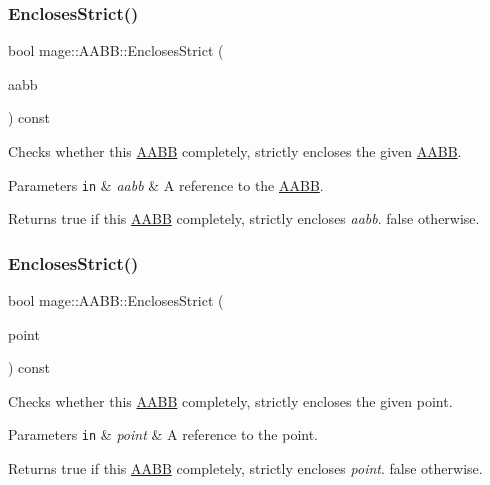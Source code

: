 \subsubsection{\texorpdfstring{Encloses\+Strict()}{EnclosesStrict()}\hspace{0.1cm}{\footnotesize\ttfamily [1/3]}}
{\footnotesize\ttfamily bool mage\+::\+A\+A\+B\+B\+::\+Encloses\+Strict (\begin{DoxyParamCaption}\item[{const \hyperlink{structmage_1_1_a_a_b_b}{A\+A\+BB} \&}]{aabb }\end{DoxyParamCaption}) const}

Checks whether this \hyperlink{structmage_1_1_a_a_b_b}{A\+A\+BB} completely, strictly encloses the given \hyperlink{structmage_1_1_a_a_b_b}{A\+A\+BB}.


\begin{DoxyParams}[1]{Parameters}
\mbox{\tt in}  & {\em aabb} & A reference to the \hyperlink{structmage_1_1_a_a_b_b}{A\+A\+BB}. \\
\hline
\end{DoxyParams}
\begin{DoxyReturn}{Returns}
{\ttfamily true} if this \hyperlink{structmage_1_1_a_a_b_b}{A\+A\+BB} completely, strictly encloses {\itshape aabb}. {\ttfamily false} otherwise. 
\end{DoxyReturn}
\hypertarget{structmage_1_1_a_a_b_b_a436950a97b647179506bb42a3f2f2b34}{}\label{structmage_1_1_a_a_b_b_a436950a97b647179506bb42a3f2f2b34} 
\subsubsection{\texorpdfstring{Encloses\+Strict()}{EnclosesStrict()}\hspace{0.1cm}{\footnotesize\ttfamily [2/3]}}
{\footnotesize\ttfamily bool mage\+::\+A\+A\+B\+B\+::\+Encloses\+Strict (\begin{DoxyParamCaption}\item[{const \hyperlink{structmage_1_1_point3}{Point3} \&}]{point }\end{DoxyParamCaption}) const}

Checks whether this \hyperlink{structmage_1_1_a_a_b_b}{A\+A\+BB} completely, strictly encloses the given point.


\begin{DoxyParams}[1]{Parameters}
\mbox{\tt in}  & {\em point} & A reference to the point. \\
\hline
\end{DoxyParams}
\begin{DoxyReturn}{Returns}
{\ttfamily true} if this \hyperlink{structmage_1_1_a_a_b_b}{A\+A\+BB} completely, strictly encloses {\itshape point}. {\ttfamily false} otherwise. 
\end{DoxyReturn}
\hypertarget{structmage_1_1_a_a_b_b_acc5a6584d01c80abf5a59405b21e1a2c}{}\label{structmage_1_1_a_a_b_b_acc5a6584d01c80abf5a59405b21e1a2c} 
